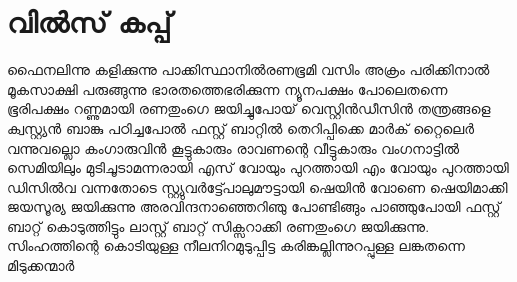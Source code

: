 \chapter{വിൽസ് കപ്പ്}
\obeylines
\noindent
ഫൈനലിന്നു കളിക്കുന്നു
പാക്കിസ്ഥാനിൽരണഭൂമി
വസിം അക്രം പരിക്കിനാൽ 
മൂകസാക്ഷി പരുങ്ങുന്നു
ഭാരതത്തെഭരിക്കുന്ന 
ന്യൂനപക്ഷം പോലെതന്നെ
ഭൂരിപക്ഷം റണ്ണുമായി 
രണതുംഗെ ജയിച്ചുപോയ്
വെസ്റ്റിൻഡീസിൻ തന്ത്രങ്ങളെ
ക്വസ്റ്റ്യൻ ബാങ്കു പഠിച്ചപോൽ
ഫസ്റ്റ് ബാറ്റിൽ തെറിപ്പിക്കെ
മാർക് റ്റൈലെർ വന്നുവല്ലൊ
കംഗാരുവിൻ കൂട്ടുകാരും 
രാവണന്റെ വീട്ടുകാരും
വംഗനാട്ടിൽ സെമിയിലും
മുടിചൂടാമന്നരായി
എസ് വോയും പുറത്തായി
എം വോയും പുറത്തായി
ഡിസിൽവ വന്നതോടെ
സ്റ്റ്യുവർട്ട്പോലുമൗട്ടായി
ഷെയിൻ വോണെ ഷെയിമാക്കി
ജയസൂര്യ ജയിക്കുന്നു
അരവിന്ദനാഞ്ഞെറിഞു
പോണ്ടിങ്ങും പാഞ്ഞുപോയി
ഫസ്റ്റ് ബാറ്റ് കൊടുത്തിട്ടും
ലാസ്റ്റ് ബാറ്റ് സിക്സറാക്കി
രണതുംഗെ ജയിക്കുന്നു.
സിംഹത്തിന്റെ കൊടിയുള്ള
നീലനിറമുടുപ്പിട്ട
കരിങ്കല്ലിന്നുറപ്പുള്ള
ലങ്കതന്നെ മിടുക്കന്മാർ

